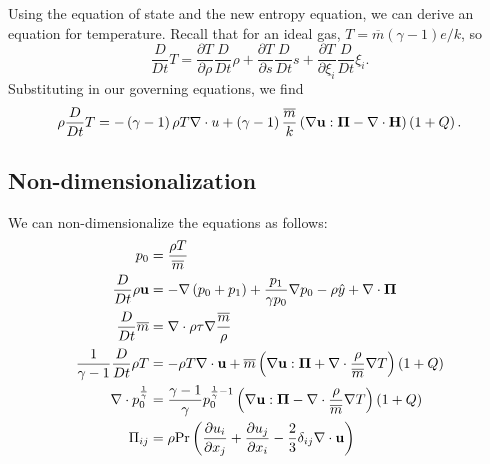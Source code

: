Using the equation of state and the new entropy equation, we can derive an equation for temperature.
	Recall that for an ideal gas, $T=\overline{m}\left(\gamma - 1\right)e/k$, so
	\begin{equation}
		\frac{D}{Dt}T=\frac{\partial T}{\partial \rho}\frac{D}{Dt}\rho + \frac{\partial T}{\partial s}\frac{D}{Dt}s + \frac{\partial T}{\partial \xi_{i}}\frac{D}{Dt}\xi_{i}.
	\end{equation}
	Substituting in our governing equations, we find
	\begin{equation}
		\rho\frac{D}{Dt}T=-\left(\gamma - 1\right)\rho T\nabla\cdot{u} + \left(\gamma - 1\right)\frac{\overline{m}}{k}\left(\nabla\mathbf{u}:\mathbf{\Pi}-\nabla\cdot{\mathbf{H}}\right)\left(1 + Q\right).
	\end{equation}


\subsection{Non-dimensionalization} %
\label{sub:model:nondim}

	We can non-dimensionalize the equations as follows:
		\begin{align}
			p_{0} &= \frac{\rho T}{\overline{m}} \\
			\frac{D}{Dt}\rho\mathbf{u} &= -\nabla\left(p_{0} + p_{1}\right) + \frac{p_{1}}{\gamma p_{0}}\nabla{p_{0}} - \rho \hat{y} + \nabla \cdot \mathbf{\Pi} \\
			\frac{D}{Dt}\overline{m} &= \nabla \cdot \rho \tau \nabla \frac{\overline {m}}{\rho} \\
			\frac{1}{\gamma - 1}\frac{D}{Dt}\rho T &= -\rho T \nabla \cdot \mathbf{u} + \overline{m}\left(\nabla\mathbf{u}:\mathbf{\Pi} + \nabla\cdot \frac{\rho}{\overline{m}}\nabla{T}\right)\left(1 + Q\right) \\
			\nabla\cdot{p_{0}^{\frac{1}{\gamma}}} &= \frac{\gamma - 1}{\gamma}p_{0}^{\frac{1}{\gamma}-1}\left(\nabla\mathbf{u}:\mathbf{\Pi}-\nabla\cdot \frac{\rho}{\overline{m}}\nabla{T}\right)\left(1 + Q\right) \\
			\Pi_{ij} &= \rho \mathrm{Pr}\left(\frac{\partial u_{i}}{\partial x_{j}} + \frac{\partial u_{j}}{\partial x_{i}} - \frac{2}{3}\delta_{ij}\nabla\cdot{\mathbf{u}}\right)
		\end{align}


